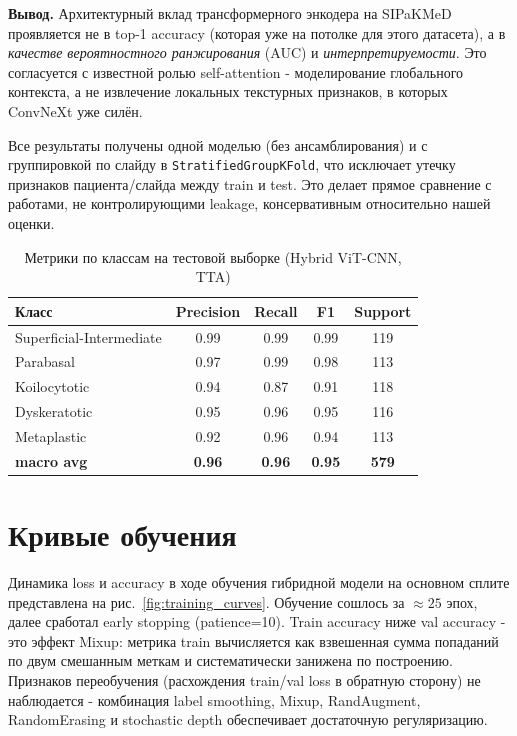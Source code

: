 \documentclass[14pt,a4paper]{extreport}
\begin{document}
\textbf{Вывод.} Архитектурный вклад трансформерного энкодера на SIPaKMeD
проявляется не в top-1 accuracy (которая уже на потолке для этого
датасета), а в \textit{качестве вероятностного ранжирования} (AUC) и
\textit{интерпретируемости}. Это согласуется с известной ролью
self-attention - моделирование глобального контекста, а не извлечение
локальных текстурных признаков, в которых ConvNeXt уже силён.

Все результаты получены одной моделью (без ансамблирования) и с
группировкой по слайду в \texttt{StratifiedGroupKFold}, что исключает
утечку признаков пациента/слайда между train и test. Это делает прямое
сравнение с работами, не контролирующими leakage, консервативным
относительно нашей оценки.

\begin{table}[H]
\centering
\caption{Метрики по классам на тестовой выборке (Hybrid ViT-CNN, TTA)}
\label{tab:per_class}
\begin{tabular}{lcccc}
\toprule
Класс & Precision & Recall & F1 & Support \\
\midrule
Superficial-Intermediate & 0.99 & 0.99 & 0.99 & 119 \\
Parabasal                & 0.97 & 0.99 & 0.98 & 113 \\
Koilocytotic             & 0.94 & 0.87 & 0.91 & 118 \\
Dyskeratotic             & 0.95 & 0.96 & 0.95 & 116 \\
Metaplastic              & 0.92 & 0.96 & 0.94 & 113 \\
\midrule
\textbf{macro avg}       & \textbf{0.96} & \textbf{0.96} & \textbf{0.95} & \textbf{579} \\
\bottomrule
\end{tabular}
\end{table}

\section{Кривые обучения}

Динамика loss и accuracy в ходе обучения гибридной модели на основном
сплите представлена на рис.~\ref{fig:training_curves}. Обучение
сошлось за $\approx 25$ эпох, далее сработал early stopping (patience=10).
Train accuracy ниже val accuracy - это эффект Mixup: метрика train
вычисляется как взвешенная сумма попаданий по двум смешанным меткам и
систематически занижена по построению. Признаков переобучения
(расхождения train/val loss в обратную сторону) не наблюдается -
комбинация label smoothing, Mixup, RandAugment, RandomErasing и
stochastic depth обеспечивает достаточную регуляризацию.
\end{document}
